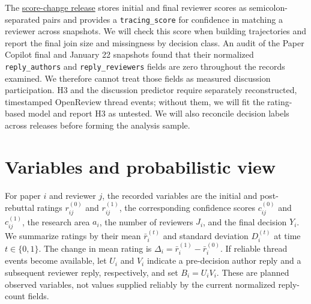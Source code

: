 \documentclass[11pt]{article}
\begin{document}
The \href{https://github.com/papercopilot/iclr-insights}{score-change release} stores initial and final reviewer scores as semicolon-separated pairs and provides a \texttt{tracing\_score} for confidence in matching a reviewer across snapshots. We will check this score when building trajectories and report the final join size and missingness by decision class. An audit of the Paper Copilot final and January 22 snapshots found that their normalized \texttt{reply\_authors} and \texttt{reply\_reviewers} fields are zero throughout the records examined. We therefore cannot treat those fields as measured discussion participation. H3 and the discussion predictor require separately reconstructed, timestamped OpenReview thread events; without them, we will fit the rating-based model and report H3 as untested. We will also reconcile decision labels across releases before forming the analysis sample.

\section*{Variables and probabilistic view}
For paper $i$ and reviewer $j$, the recorded variables are the initial and post-rebuttal ratings $r_{ij}^{(0)}$ and $r_{ij}^{(1)}$, the corresponding confidence scores $c_{ij}^{(0)}$ and $c_{ij}^{(1)}$, the research area $a_i$, the number of reviewers $J_i$, and the final decision $Y_i$. We summarize ratings by their mean $\bar r_i^{(t)}$ and standard deviation $D_i^{(t)}$ at time $t\in\{0,1\}$. The change in mean rating is $\Delta_i=\bar r_i^{(1)}-\bar r_i^{(0)}$. If reliable thread events become available, let $U_i$ and $V_i$ indicate a pre-decision author reply and a subsequent reviewer reply, respectively, and set $B_i=U_iV_i$. These are planned observed variables, not values supplied reliably by the current normalized reply-count fields.
\end{document}

